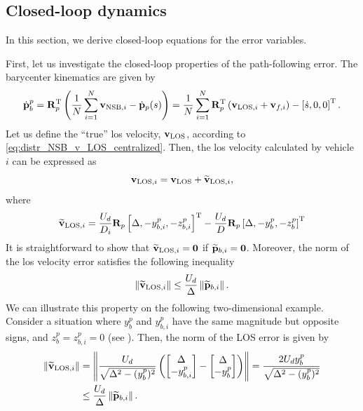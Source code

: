 \subsection{Closed-loop dynamics}
In this section, we derive closed-loop equations for the error variables.

First, let us investigate the closed-loop properties of the path-following error.
The barycenter kinematics are given by
\begin{equation}
        \dot{\mathbf{p}}_b^p = \mathbf{R}_p^{\mathrm{T}} \left(\frac{1}{N}\sum_{i=1}^N \mathbf{v}_{{\rm NSB}, i} - \dot{\mathbf{p}}_p(s)\right)
        = \frac{1}{N}\sum_{i=1}^N\mathbf{R}_p^{\mathrm{T}} \left(\mathbf{v}_{{\rm LOS}, i} + \mathbf{v}_{f, i}\right) - \left[\dot{s}, 0, 0\right]^{\mathrm{T}}.
    \label{eq:distr_NSB_p_b_CL_1}
\end{equation}
Let us define the ``true'' \gls{los} velocity, $\mathbf{v}_{\rm LOS}$, according to \eqref{eq:distr_NSB_v_LOS_centralized}.
Then, the \gls{los} velocity calculated by vehicle $i$ can be expressed as
\begin{equation}
    \mathbf{v}_{{\rm LOS}, i} = \mathbf{v}_{\rm LOS} + \widetilde{\mathbf{v}}_{{\rm LOS}, i}, \label{eq:distr_NSB_v_LOS_CL}
\end{equation}
where
\begin{equation}
    \widetilde{\mathbf{v}}_{{\rm LOS}, i} = \frac{U_d}{D_i} \mathbf{R}_p \left[\Delta, -y_{b, i}^p, -z_{b, i}^p\right]^{\mathrm{T}} - \frac{U_d}{D} \mathbf{R}_p \left[\Delta, -y_{b}^p, -z_{b}^p\right]^{\mathrm{T}}
\end{equation}
It is straightforward to show that $\widetilde{\mathbf{v}}_{{\rm LOS}, i} = \mathbf{0}$ if $\widetilde{\mathbf{p}}_{b, i} = \mathbf{0}$.
Moreover, the norm of the \gls{los} velocity error satisfies the following inequality
\begin{equation}
    \left\|\widetilde{\mathbf{v}}_{{\rm LOS}, i}\right\| \leq \frac{U_d}{\Delta} \left\|\widetilde{\mathbf{p}}_{b, i}\right\|.
    \label{eq:distr_NSB_v_LOS_tilde}
\end{equation}
We can illustrate this property on the following two-dimensional example.
Consider a situation where $y_b^p$ and $y_{b,i}^p$ have the same magnitude but opposite signs, and $z_b^p = z_{b,i}^p = 0$ (see ).
Then, the norm of the LOS error is given by
\begin{equation}
    \begin{split}
        \left\|\widetilde{\mathbf{v}}_{{\rm LOS}, i}\right\| &= \left\|\frac{U_d}{\sqrt{\Delta^2 - (y_b^p)^2}}\left(\begin{bmatrix} \Delta \\ -y_{b,i}^p \end{bmatrix} - \begin{bmatrix} \Delta \\ -y_b^p \end{bmatrix}\right)\right\| = \frac{2 U_d y_b^p}{\sqrt{\Delta^2 - (y_b^p)^2}} \\
        &\leq \frac{U_d}{\Delta} \left\|\widetilde{\mathbf{p}}_{b, i}\right\|.
    \end{split}
\end{equation}
